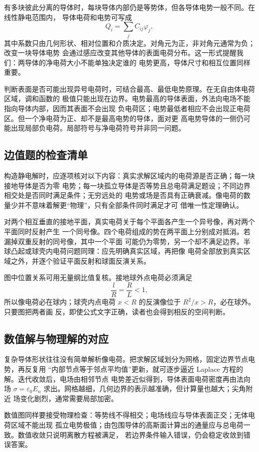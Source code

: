 有多块彼此分离的导体时，每块导体内部仍是等势体，但各导体电势一般不同。在线性静电范围内，
导体电荷和电势可写成
\[
 Q_i=\sum_j C_{ij}\varphi_j,
\]
其中系数只由几何形状、相对位置和介质决定。对角元为正，非对角元通常为负；改变一块导体电势
会通过感应改变其他导体的表面电荷分布。这一形式提醒我们：两导体的净电荷大小不能单独决定谁的
电势更高，导体尺寸和相互位置同样重要。

判断表面是否可能出现异号电荷时，可结合最高、最低电势原理。在无自由体电荷区域，调和函数的
极值只能出现在边界。电势最高的导体表面，外法向电场不能指向导体内部，因而其表面不会出现
负电荷区；电势最低者相应不会出现正电荷区。但一个净电荷为正、却不是最高电势的导体，面对更
高电势导体的一侧仍可能出现局部负电荷。局部符号与净电荷符号并非同一问题。

\subsection*{边值题的检查清单}

构造静电解时，应逐项核对以下内容：真实求解区域内的电荷源是否正确；每一块接地导体是否为零
电势；每一块孤立导体是否等势且总电荷满足题设；不同边界相交处是否同时满足条件；无穷远处的
电势或场是否具有正确衰减。像电荷的数量少并不意味着解更“物理”，只有全部条件同时满足才可
借唯一性定理确认。

对两个相互垂直的接地平面，真实电荷关于每个平面各产生一个异号像，再对两个平面同时反射产生
一个同号像。四个电荷组成的势在两平面上分别成对抵消。若漏掉双重反射的同号像，其中一个平面
可能仍为零势，另一个却不满足边界。半球凸起或球壳内电荷问题同理：应先明确真实区域，再把像
电荷全部放到真实区域之外，并逐个验证平面反射和球面反演关系。

图中位置关系可用无量纲比值复核。接地球外点电荷必须满足
\[
 \frac{l}{R}=\frac{R}{L}<1,
\]
所以像电荷必在球内；球壳内点电荷 $x<R$ 的反演像位于 $R^2/x>R$，必在球外。只要图把两者画
反，即使公式文字正确，读者也会得到相反的空间判断。

\subsection*{数值解与物理解的对应}

复杂导体形状往往没有简单解析像电荷。把求解区域划分为网格，固定边界节点电势，再反复用
“内部节点等于邻点平均值”更新，就可逐步逼近 Laplace 方程的解。迭代收敛后，电场由相邻节点
电势差近似得到，导体表面电荷密度再由法向场
$\sigma=\varepsilon_0E_n$ 求出。网格越细，几何边界的表示越准确，但计算量也越大；尖角附近
场变化剧烈，通常需要局部加密。

数值图同样要接受物理检查：等势线不得相交；电场线应与导体表面正交；无体电荷区域不能出现
孤立电势极值；由包围导体的高斯面计算出的通量应与总电荷一致。数值收敛只说明离散方程被满足，
若边界条件输入错误，仍会稳定收敛到错误答案。

